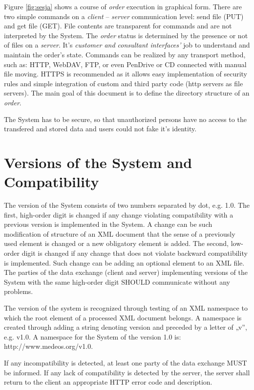\documentclass[a4paper]{article}
\begin{document}
Figure \ref{fig:sesja} shows a course of \emph{order} execution in graphical form.
There are two simple commands on a \emph{client} -- \emph{server} communication level:
send file (PUT) and get file (GET). File contents are transparent for commands and are not
interpreted by the System. The \emph{order} status is determined by the presence or
not of files on a \emph{server}. It's \emph{customer and consultant interfaces'} job
to understand and maintain the order's state. Commands can be realized by any transport
method, such as: HTTP, WebDAV, FTP, or even PenDrive or CD connected with manual file
moving. HTTPS is recommended as it allows easy implementation of security rules and simple
integration of custom and third party code (http servers as file servers). The main goal
of this document is to define the directory structure of an \emph{order}.

The System has to be secure, so that unauthorized persons have no access to the
transfered and stored data and users could not fake it's identity. 

\section{Versions of the System and Compatibility}
The version of the System consists of two numbers separated by dot, e.g. 1.0. The first, 
high-order digit is changed if any change violating compatibility with a previous version 
is implemented in the System. A change can be such modification of structure of an XML document
that the sense of a previously used element is changed or a new obligatory element is added. 
The second, low-order digit is changed if any change that does not violate backward 
compatibility is implemented. Such change can be adding an optional element to an XML file. 
The parties of the data exchange (client and server) implementing versions of the System with 
the same high-order digit SHOULD communicate without any problems.

The version of the system is recognized through testing of an XML namespace to which the root 
element of a processed XML document belongs. A namespace is created through adding a string 
denoting version and preceded by a letter of „v”, e.g. v1.0. A namespace for the System of 
the version 1.0 is: http://www.medeos.org/v1.0.

If any incompatibility is detected, at least one party of the data exchange MUST be informed. 
If any lack of compatibility is detected by the server, the server shall return to the client 
an appropriate HTTP error code and description.
\end{document}

